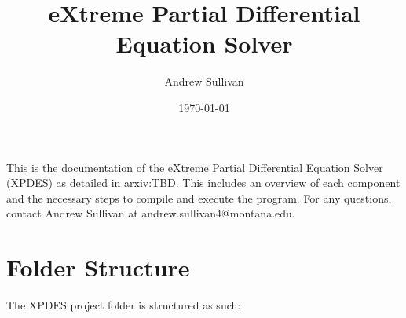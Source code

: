 \documentclass{article}
\begin{document}
\title{eXtreme Partial Differential Equation Solver}

\author{Andrew Sullivan}

\date{\today}

\maketitle


This is the documentation of the eXtreme Partial Differential Equation Solver (XPDES) as detailed
in arxiv:TBD. This includes an overview of each component and the necessary steps to compile and
execute the program. For any questions, contact Andrew Sullivan at andrew.sullivan4@montana.edu.

\section{Folder Structure}
\label{sec:folderstruct}

The XPDES project folder is structured as such:
\end{document}
